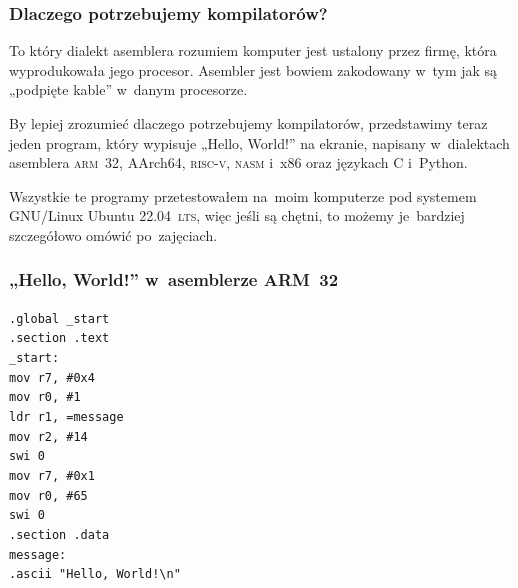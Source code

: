 \documentclass[10pt,t]{beamer}
\begin{document}
\begin{frame}
  \frametitle{Dlaczego potrzebujemy kompilatorów?}


  To który dialekt asemblera rozumiem komputer jest ustalony przez firmę,
  która wyprodukowała jego procesor. Asembler jest bowiem zakodowany w~tym
  jak są „podpięte kable” w~danym procesorze.

  By lepiej zrozumieć dlaczego potrzebujemy kompilatorów, przedstawimy
  teraz jeden program, który wypisuje „Hello, World!” na ekranie, napisany
  w~dialektach asemblera \textsc{arm~32}, AArch64, \textsc{risc-v},
  \textsc{nasm} i~x86 oraz językach C i~Python.

  Wszystkie te programy przetestowałem na~moim komputerze pod systemem
  GNU/Linux Ubuntu 22.04~\textsc{lts}, więc jeśli są chętni, to możemy
  je~bardziej szczegółowo omówić po~zajęciach.

\end{frame}





\begin{frame}
  \frametitle{„Hello, World!” w~asemblerze ARM~32
    \parencite{Low-Level-You-Can-Learn-ARM-ETC-Ver-2020}}


  \texttt{.global \_start} \\
  \texttt{.section .text} \\



  \texttt{\_start:} \\[-0.2em]
  \hphantom{aaaaaaaa} \texttt{mov r7, \#0x4} \\
  \hphantom{aaaaaaaa} \texttt{mov r0, \#1} \\
  \hphantom{aaaaaaaa} \texttt{ldr r1, =message} \\
  \hphantom{aaaaaaaa} \texttt{mov r2, \#14} \\

  \hphantom{aaaaaaaa} \texttt{swi 0} \\

  \hphantom{aaaaaaaa} \texttt{mov r7, \#0x1} \\
  \hphantom{aaaaaaaa} \texttt{mov r0, \#65} \\

  \hphantom{aaaaaaaa} \texttt{swi 0} \\



  \texttt{.section .data} \\
  \texttt{message:} \\
  \hphantom{aaaaaaaa} \texttt{.ascii "Hello, World!\textbackslash n"}

\end{frame}
\end{document}
